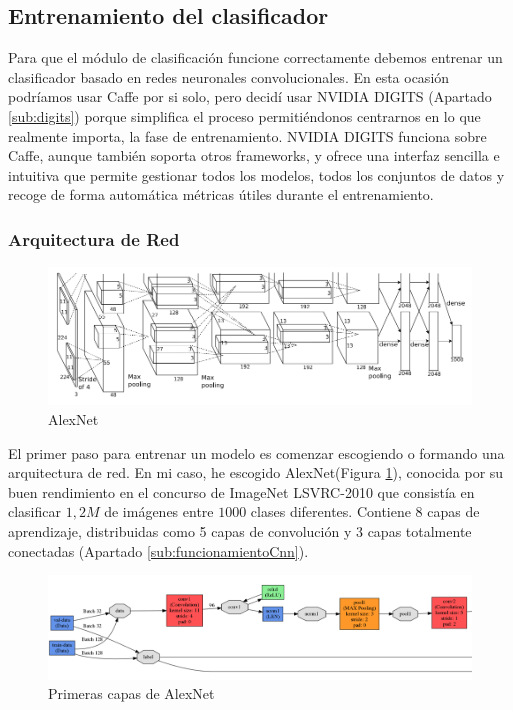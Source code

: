 \documentclass[a4paper,11pt]{book}
\begin{document}
\subsection{Entrenamiento del clasificador}
Para que el módulo de clasificación funcione correctamente debemos entrenar un clasificador basado en redes neuronales convolucionales. En esta ocasión podríamos usar Caffe por si solo, pero decidí usar NVIDIA DIGITS (Apartado \ref{sub:digits}) porque simplifica el proceso permitiéndonos centrarnos en lo que realmente importa, la fase de entrenamiento. NVIDIA DIGITS funciona sobre Caffe, aunque también soporta otros frameworks, y ofrece una interfaz sencilla e intuitiva que permite gestionar todos los modelos, todos los conjuntos de datos y recoge de forma automática métricas útiles durante el entrenamiento.

\subsubsection{Arquitectura de Red}

\begin{figure}[h]
\centering
\includegraphics[width=1\linewidth]{imagenes/alexNet}
\caption[AlexNet]{AlexNet\cite{krizhevsky12}}
\label{fig:alexNet}
\end{figure}
El primer paso para entrenar un modelo es comenzar escogiendo o formando una arquitectura de red. En mi caso, he escogido AlexNet\cite{krizhevsky12}(Figura \ref{fig:alexNet}), conocida por su buen rendimiento en el concurso de ImageNet LSVRC-2010 que consistía en clasificar \(1,2M\) de imágenes entre \(1000\) clases diferentes.
Contiene 8 capas de aprendizaje, distribuidas como 5 capas de convolución y 3 capas totalmente conectadas (Apartado \ref{sub:funcionamientoCnn}).\\

\begin{figure}[h]
\centering
\includegraphics[width=1\linewidth]{imagenes/alexNet1}
\caption[AlexNet input]{Primeras capas de AlexNet}
\label{fig:alexNet1}
\end{figure}
\end{document}
